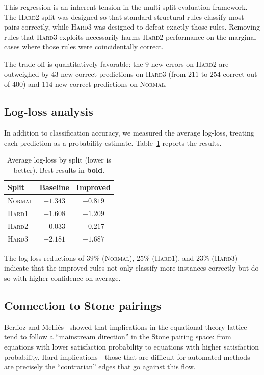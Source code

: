 This regression is an inherent tension in the multi-split
evaluation framework.  The \textsc{Hard2} split was designed so
that standard structural rules classify most pairs correctly,
while \textsc{Hard3} was designed to defeat exactly those rules.
Removing rules that \textsc{Hard3} exploits necessarily harms
\textsc{Hard2} performance on the marginal cases where those
rules were coincidentally correct.

The trade-off is quantitatively favorable: the $9$ new errors on
\textsc{Hard2} are outweighed by $43$ new correct predictions on
\textsc{Hard3} (from $211$ to $254$ correct out of $400$) and
$114$ new correct predictions on \textsc{Normal}.

\subsection{Log-loss analysis}

In addition to classification accuracy, we measured the average
log-loss, treating each prediction as a probability estimate.
Table~\ref{tab:logloss} reports the results.

\begin{table}[ht]
\centering
\caption{Average log-loss by split (lower is better).
Best results in \textbf{bold}.}\label{tab:logloss}
\begin{tabular}{@{}lcc@{}}
\toprule
Split & Baseline & Improved \\
\midrule
\textsc{Normal} & $-1.343$ & $\mathbf{-0.819}$ \\
\textsc{Hard1}  & $-1.608$ & $\mathbf{-1.209}$ \\
\textsc{Hard2}  & $\mathbf{-0.033}$ & $-0.217$ \\
\textsc{Hard3}  & $-2.181$ & $\mathbf{-1.687}$ \\
\bottomrule
\end{tabular}
\end{table}

The log-loss reductions of $39\%$ (\textsc{Normal}), $25\%$
(\textsc{Hard1}), and $23\%$ (\textsc{Hard3}) indicate that
the improved rules not only classify more instances correctly
but do so with higher confidence on average.

\subsection{Connection to Stone pairings}

Berlioz and Melli\`es~\cite{berlioz2026latent} showed that
implications in the equational theory lattice tend to follow a
``mainstream direction'' in the Stone pairing space: from equations
with lower satisfaction probability to equations with higher
satisfaction probability.  Hard implications---those that are
difficult for automated methods---are precisely the
``contrarian'' edges that go against this flow.

